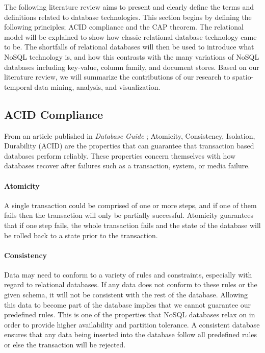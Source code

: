 The following literature review aims to present and clearly define the terms and definitions related to database technologies. This section begins by defining the following principles; ACID compliance and the CAP theorem. The relational model will be explained to show how classic relational database technology came to be. The shortfalls of relational databases will then be used to introduce what NoSQL technology is, and how this contrasts with the many variations of NoSQL databases including key-value, column family, and document stores. Based on our literature review, we will summarize the contributions of our research to spatio-temporal data mining, analysis, and visualization.

\subsection{ACID Compliance}
\label{sec:acid}

From an article published in \emph{Database Guide} \cite{acid}; Atomicity, Consistency, Isolation, Durability (ACID) are the properties that can guarantee that transaction based databases perform reliably. These properties concern themselves with how databases recover after failures such as a transaction, system, or media failure.

\paragraph{Atomicity}
A single transaction could be comprised of one or more steps, and if one of them fails then the transaction will only be partially successful. Atomicity guarantees that if one step fails, the whole transaction fails and the state of the database will be rolled back to a state prior to the transaction.

\paragraph{Consistency}
Data may need to conform to a variety of rules and constraints, especially with regard to relational databases. If any data does not conform to these rules or the given schema, it will not be consistent with the rest of the database. Allowing this data to become part of the database implies that we cannot guarantee our predefined rules. This is one of the properties that NoSQL databases relax on in order to provide higher availability and partition tolerance. A consistent database ensures that any data being inserted into the database follow all predefined rules or else the transaction will be rejected.

